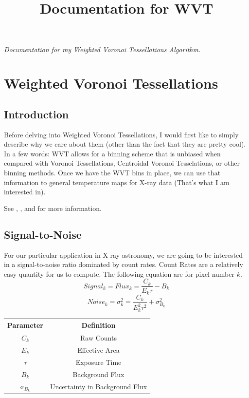\documentclass[11pt,letterpaper]{article}
\begin{document}
\univlogo

\title{Documentation for WVT}

\textit{Documentation for my Weighted Voronoi Tessellations Algorithm.}

\tableofcontents

\newpage


\newpage
\section{Weighted Voronoi Tessellations}

\subsection{Introduction}
Before delving into Weighted Voronoi Tessellations, I would first like to simply describe why we care about them (other than the fact that they are pretty cool). In a few words: WVT allows for a binning scheme that is unbiased when compared with Voronoi Tessellations, Centroidal Voronoi Tesselations, or other binning methods. Once we have the WVT bins in place, we can use that information to general temperature maps for X-ray data (That's what I am interested in).

See \cite{Copin2018}, \cite{Diehl2008}, and \cite{Sanders2018} for more information.
\subsection{Signal-to-Noise}
For our particular application in X-ray astronomy, we are going to be interested in a signal-to-noise ratio dominated by count rates. Count Rates are a relatively easy quantity for us to compute.
The following equation are for pixel number $k$.
\begin{equation}\label{eqn:signal}
	Signal_k = Flux_k = \frac{C_k}{E_k \tau}-B_k
\end{equation}
\begin{equation}\label{eqn:noise}
	Noise_k = \sigma^2_k = \frac{C_k}{E^2_k\tau^2}+\sigma^2_{B_k}
\end{equation}

\begin{center}
	\begin{tabular}{|c|c|}
		\hline 
		Parameter & Definition \\
		\hline
		\hline
		$C_k$ & Raw Counts \\
		\hline 
		$E_k$ & Effective Area \\
		\hline 
		$\tau$ & Exposure Time \\
		\hline
		$B_k$ & Background Flux \\
		\hline 
		$\sigma_{B_k}$ & Uncertainty in Background Flux \\
		\hline
	\end{tabular}
\end{center}
\end{document}

